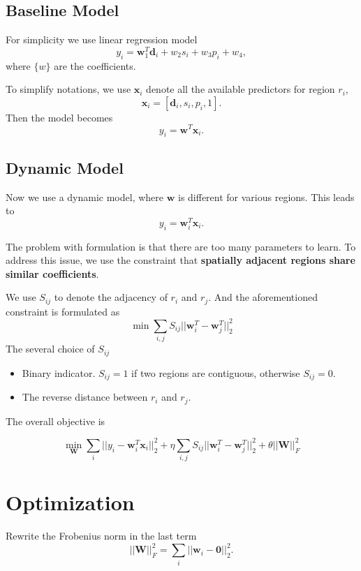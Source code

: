 \documentclass{article}
\begin{document}
\subsection{Baseline Model}

For simplicity we use linear regression model
\[
y_i = \mathbf{w}_1^T \mathbf{d}_i + w_2 s_i + w_3 p_i + w_4,
\]
where $\{ w \}$ are the coefficients.

To simplify notations, we use $\mathbf{x}_i$ denote all the available predictors for region $r_i$,
\[
\mathbf{x}_i = [ \mathbf{d}_i, s_i, p_i, 1 ].
\]
Then the model becomes 
\[
y_i = \mathbf{w}^T \mathbf{x}_i.
\]


\subsection{Dynamic Model}

Now we use a dynamic model, where $\mathbf{w}$ is different for various regions.
This leads to 
\[
y_i  = \mathbf{w}_i^T \mathbf{x}_i.
\]


The problem with formulation is that there are too many parameters to learn. To address this issue, we use the constraint that \textbf{spatially adjacent regions share similar coefficients}.

We use $S_{ij}$ to denote the adjacency of $r_i$ and $r_j$. And the aforementioned constraint is formulated as
\[
\min \sum_{i,j} S_{ij} ||\mathbf{w}_i^T - \mathbf{w}_j^T||_2^2
\] The several choice of $S_{ij}$
\begin{itemize}
\item Binary indicator. $S_{ij} = 1$ if two regions are contiguous, otherwise $S_{ij} = 0$.
\item The reverse distance between $r_i$ and $r_j$. 
\end{itemize}

The overall objective is

\begin{equation}
\label{eq:obj}
\min_{\mathbf{W}}  \sum_i || y_i - \mathbf{w}_i^T \mathbf{x}_i ||_2^2 + \eta \sum_{i,j} S_{ij} ||\mathbf{w}_i^T - \mathbf{w}_j^T||_2^2 
+ \theta || \mathbf{W} ||_F^2
\end{equation}




\section{Optimization}


Rewrite the Frobenius norm in the last term
\[
|| \mathbf{W} ||_F^2 = \sum_i || \mathbf{w}_i - \mathbf{0}||_2^2.
\]
\end{document}
